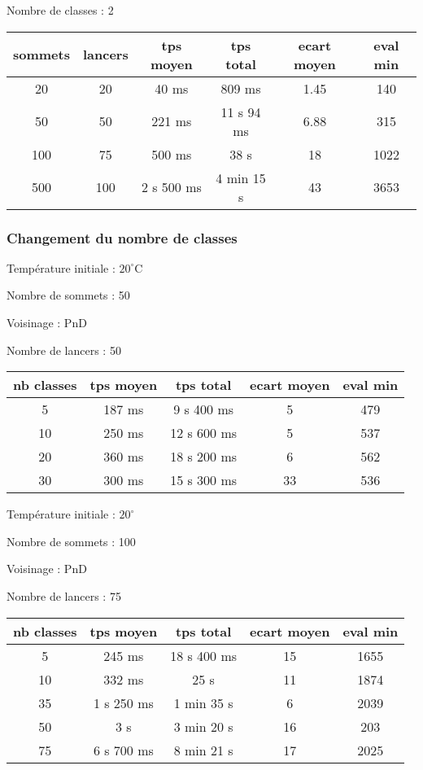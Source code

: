 \documentclass[12pt]{article}
\begin{document}
Nombre de classes : 2

\bigskip
\begin{tabular}{|c|c|c|c|c|c|}
	\hline 
	sommets & lancers & tps moyen & tps total & ecart moyen & eval min\\
	\hline
	20 & 20 & 40 ms & 809 ms & 1.45 & 140 \\
	\hline
	 50  &  50  & 221 ms   &  11 s 94 ms  &   6.88  & 315\\
	\hline
	 100  &  75  &   500  ms   &  38 s &   18  &  1022   \\
	\hline
	 500  &  100  &   2 s 500   ms  & 4 min 15 s & 43  & 3653  \\
	\hline
\end{tabular}
\bigskip

\subsubsection*{Changement du nombre de classes}

Température initiale : $20^\circ$C

Nombre de sommets : 50 

Voisinage : PnD

Nombre de lancers : 50
\bigskip

\begin{tabular}{|c|c|c|c|c|}
	\hline 
	nb classes & tps moyen & tps total & ecart moyen & eval min\\
	\hline
	5 & 187 ms & 9 s 400 ms & 5 & 479 \\
	\hline
	10  &  250   ms   &  12  s   600 ms   &  5   &  537   \\
	\hline
	20 &  360   ms   &  18 s  200  ms    &  6   &   562  \\
	\hline
	30  &   300 ms  &  15 s  300  ms   &  33   &    536 \\
	\hline
\end{tabular}

\bigskip

Température initiale : $20^\circ$

Nombre de sommets : 100 

Voisinage : PnD

Nombre de lancers : 75
\bigskip

\begin{tabular}{|c|c|c|c|c|}
	\hline 
	nb classes & tps moyen & tps total & ecart moyen & eval min\\
	\hline
	5 & 245 ms & 18 s 400 ms & 15 & 1655 \\
	\hline
	10  &  332   ms   &  25  s  &  11   &  1874   \\
	\hline
	35  &   1 s 250 ms   & 1 min 35  s &   6  &   2039  \\
	\hline
	50  &   3 s & 3 min  20 s &   16 &   203  \\
	\hline
	75  &   6 s 700 ms & 8 min  21 s  &  17   &  2025   \\
	\hline
\end{tabular}
\end{document}
